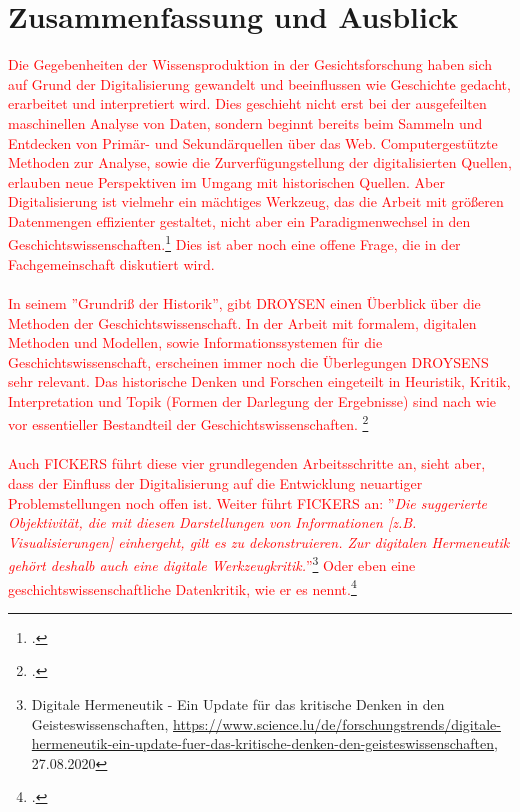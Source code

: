 \documentclass[12pt,a4paper]{article}
\begin{document}
\newpage
\section{Zusammenfassung und Ausblick}

\textcolor{red}{
Die Gegebenheiten der Wissensproduktion in der Gesichtsforschung haben sich auf Grund der Digitalisierung gewandelt und beeinflussen wie Geschichte gedacht, erarbeitet und interpretiert wird. Dies geschieht nicht erst bei der ausgefeilten maschinellen Analyse von Daten, sondern beginnt bereits beim Sammeln und Entdecken von Primär- und Sekundärquellen über das Web. Computergestützte Methoden zur Analyse, sowie die Zurverfügungstellung der digitalisierten Quellen, erlauben neue Perspektiven im Umgang mit historischen Quellen. Aber Digitalisierung ist vielmehr ein mächtiges Werkzeug, das die Arbeit mit größeren Datenmengen effizienter gestaltet, nicht aber ein Paradigmenwechsel in den Geschichtswissenschaften.\footcite[][]{koenig2020archive} Dies ist aber noch eine offene Frage, die in der Fachgemeinschaft diskutiert wird. 
\\
\\
In seinem ''Grundriß der Historik'', gibt DROYSEN einen Überblick über die Methoden der Geschichtswissenschaft. In der Arbeit mit formalem, digitalen Methoden und Modellen, sowie Informationssystemen für die Geschichtswissenschaft, erscheinen immer noch die Überlegungen DROYSENS sehr relevant. Das historische Denken und Forschen eingeteilt in Heuristik, Kritik, Interpretation und Topik (Formen der Darlegung der Ergebnisse) sind nach wie vor essentieller Bestandteil der Geschichtswissenschaften. \footcite[][S.85-116]{hardtwig1990studium}
\\
\\
Auch FICKERS führt diese vier grundlegenden Arbeitsschritte an, sieht aber, dass der Einfluss der Digitalisierung auf die Entwicklung neuartiger Problemstellungen noch offen ist. Weiter führt FICKERS an: ''\textit{Die suggerierte Objektivität, die mit diesen Darstellungen von Informationen [z.B.  Visualisierungen] einhergeht, gilt es zu dekonstruieren. Zur digitalen Hermeneutik gehört deshalb auch eine digitale Werkzeugkritik.}''\footnote{Digitale Hermeneutik - Ein Update für das kritische Denken in den Geisteswissenschaften, \url{https://www.science.lu/de/forschungstrends/digitale-hermeneutik-ein-update-fuer-das-kritische-denken-den-geisteswissenschaften}, 27.08.2020} 
Oder eben eine geschichtswissenschaftliche Datenkritik, wie er es nennt.\footcite[][S.2]{fickers2020update}
}
\end{document}
